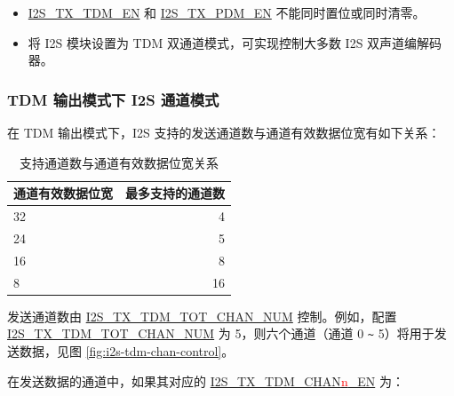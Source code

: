 \documentclass[main\_\_CN.tex]{subfiles}
\begin{document}
\begin{tiplisting}
\vspace{-2em}
\begin{itemize}
    \item \hyperref[fielddesc:I2STXTDMEN]{I2S\_TX\_TDM\_EN} 和 \hyperref[fielddesc:I2STXPDMEN]{I2S\_TX\_PDM\_EN} 不能同时置位或同时清零。 
    \item 将 I2S 模块设置为 TDM 双通道模式，可实现控制大多数 I2S 双声道编解码器。
    \end{itemize}
\end{tiplisting}

\subsubsection{TDM 输出模式下 I2S 通道模式} \label{sec:i2s-chan-control-tdm-mode}
在 TDM 输出模式下，I2S 支持的发送通道数与通道有效数据位宽有如下关系：

\begin{table}[H]
    \centering
    \caption{支持通道数与通道有效数据位宽关系}
    \label{tab:i2s-tx-support-channel}
    \begin{tabular}{|l|r|}
    \hline
    \rowcolor{lightgray}
    \textbf{通道有效数据位宽} & \textbf{最多支持的通道数} \\ \hline
        32  & 4     \\\hline
        24  & 5     \\\hline
        16  & 8     \\\hline
        8   & 16    \\\hline
    \end{tabular}
\end{table}

发送通道数由 \hyperref[fielddesc:I2STXTDMTOTCHANNUM]{I2S\_TX\_TDM\_TOT\_CHAN\_NUM} 控制。例如，配置 \hyperref[fielddesc:I2STXTDMTOTCHANNUM]{I2S\_TX\_TDM\_TOT\_CHAN\_NUM} 为 5，则六个通道（通道 0 \verb+~+ 5）将用于发送数据，见图
\ref{fig:i2s-tdm-chan-control}。 

在发送数据的通道中，如果其对应的 \hyperref[fielddesc:I2STXTDMCHAN0EN]{I2S\_TX\_TDM\_CHAN{\textcolor{red}{n}}\_EN} 为：
\end{document}
